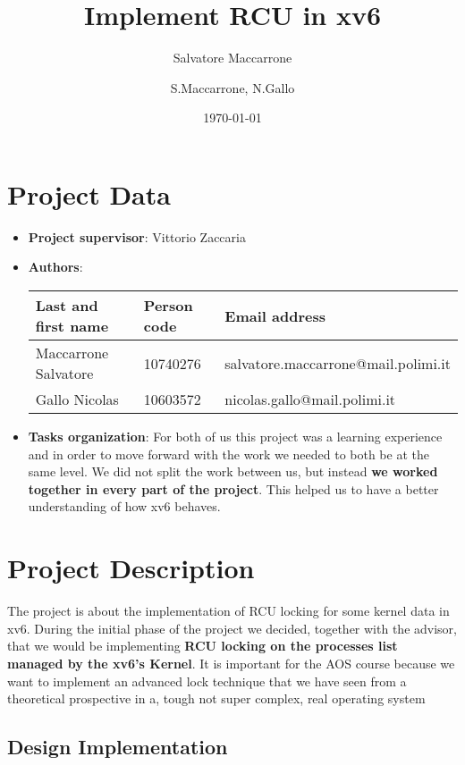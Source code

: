 \documentclass[10pt,a4]{article}
\author{Salvatore Maccarrone}
\author{S.Maccarrone, N.Gallo}
\date{\today}
\title{Implement RCU in xv6}
\begin{document}
\maketitle
\tableofcontents

\section{Project Data}
\begin{itemize}
\item 
\textbf{Project supervisor}: Vittorio Zaccaria
\item 
\textbf{Authors}: 
\begin{center}
\begin{tabular}{lll}
Last and first name & Person code & Email address\\
\hline
  Maccarrone Salvatore & 10740276 & salvatore.maccarrone@mail.polimi.it \\
  Gallo Nicolas        & 10603572 & nicolas.gallo@mail.polimi.it                     
\end{tabular}
\end{center}
\item
\textbf{Tasks organization}: 
For both of us this project was a learning experience and in order to move forward with the work we needed to both be at the same level. 
We did not split the work between us, but instead \textbf{we worked together in every part of the project}. 
This helped us to have a better understanding of how xv6 behaves.

\end{itemize}


\pagebreak
\section{Project Description}


The project is about the implementation of RCU locking for some kernel data in xv6. During the initial phase of the project we decided, 
together with the advisor, that we would be implementing \textbf{RCU locking on the processes list managed by the xv6's Kernel}.
It is important for the AOS course because we want to implement an advanced lock technique 
that we have seen from a theoretical prospective in a, tough not super complex, real operating system

\subsection{Design Implementation}
\end{document}
